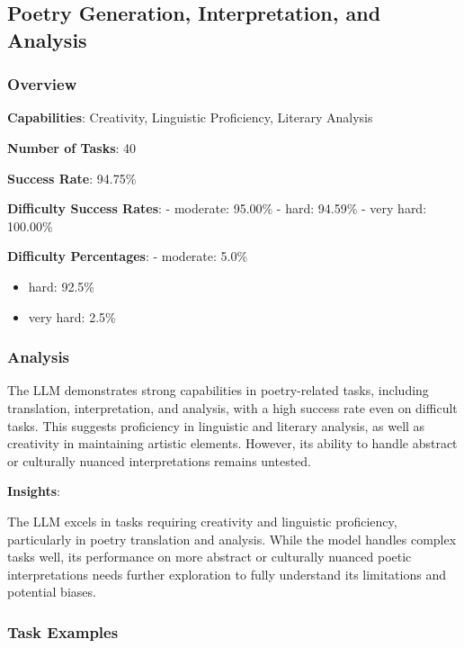 \documentclass[fleqn,10pt]{wlscirep}
\begin{document}
\hypertarget{poetry-generation-interpretation-and-analysis}{%
\subsection{Poetry Generation, Interpretation, and
Analysis}\label{poetry-generation-interpretation-and-analysis}}

\hypertarget{overview-10}{%
\subsubsection{Overview}\label{overview-10}}

\textbf{Capabilities}: Creativity, Linguistic Proficiency, Literary
Analysis

\textbf{Number of Tasks}: 40

\textbf{Success Rate}: 94.75\%

\textbf{Difficulty Success Rates}: - moderate: 95.00\% - hard: 94.59\% -
very hard: 100.00\%

\textbf{Difficulty Percentages}: - moderate: 5.0\%

\begin{itemize}
\item
  hard: 92.5\%
\item
  very hard: 2.5\%
\end{itemize}

\hypertarget{analysis-9}{%
\subsubsection{Analysis}\label{analysis-9}}

The LLM demonstrates strong capabilities in poetry-related tasks,
including translation, interpretation, and analysis, with a high success
rate even on difficult tasks. This suggests proficiency in linguistic
and literary analysis, as well as creativity in maintaining artistic
elements. However, its ability to handle abstract or culturally nuanced
interpretations remains untested.

\textbf{Insights}:

The LLM excels in tasks requiring creativity and linguistic proficiency,
particularly in poetry translation and analysis. While the model handles
complex tasks well, its performance on more abstract or culturally
nuanced poetic interpretations needs further exploration to fully
understand its limitations and potential biases.

\hypertarget{task-examples-9}{%
\subsubsection{Task Examples}\label{task-examples-9}}
\end{document}
